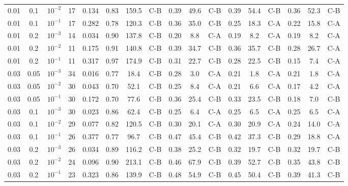\begin{tabular}{cccrrcccccccccccc}
0.01 & 0.1 & $10^{-2}$ & 17 & 0.134 & 0.83 & 159.5 & C-B & 0.39 & 49.6 & C-B & 0.39 & 54.4 & C-B & 0.36 & 52.3 & C-B \\
0.01 & 0.1 & $10^{-1}$ & 17 & 0.282 & 0.78 & 120.3 & C-B & 0.36 & 35.0 & C-B & 0.25 & 18.3 & C-A & 0.22 & 15.8 & C-A \\
0.01 & 0.2 & $10^{-3}$ & 14 & 0.034 & 0.90 & 137.8 & C-B & 0.20 & 8.8 & C-A & 0.19 & 8.2 & C-A & 0.19 & 8.2 & C-A \\
0.01 & 0.2 & $10^{-2}$ & 11 & 0.175 & 0.91 & 140.8 & C-B & 0.39 & 34.7 & C-B & 0.36 & 35.7 & C-B & 0.28 & 26.7 & C-A \\
0.01 & 0.2 & $10^{-1}$ & 11 & 0.317 & 0.97 & 174.9 & C-B & 0.31 & 22.7 & C-B & 0.28 & 22.5 & C-B & 0.15 & 7.4 & C-A \\
0.03 & 0.05 & $10^{-3}$ & 34 & 0.016 & 0.77 & 18.4 & C-B & 0.28 & 3.0 & C-A & 0.21 & 1.8 & C-A & 0.21 & 1.8 & C-A \\
0.03 & 0.05 & $10^{-2}$ & 30 & 0.043 & 0.70 & 52.1 & C-B & 0.25 & 8.4 & C-A & 0.21 & 6.6 & C-A & 0.17 & 4.2 & C-A \\
0.03 & 0.05 & $10^{-1}$ & 30 & 0.172 & 0.70 & 77.6 & C-B & 0.36 & 25.4 & C-B & 0.33 & 23.5 & C-B & 0.18 & 7.0 & C-B \\
0.03 & 0.1 & $10^{-3}$ & 30 & 0.023 & 0.86 & 62.4 & C-B & 0.25 & 6.4 & C-A & 0.25 & 6.5 & C-A & 0.25 & 6.5 & C-A \\
0.03 & 0.1 & $10^{-2}$ & 29 & 0.077 & 0.82 & 120.5 & C-B & 0.30 & 20.1 & C-A & 0.30 & 20.9 & C-A & 0.24 & 14.0 & C-A \\
0.03 & 0.1 & $10^{-1}$ & 26 & 0.377 & 0.77 & 96.7 & C-B & 0.47 & 45.4 & C-B & 0.42 & 37.3 & C-B & 0.29 & 18.8 & C-A \\
0.03 & 0.2 & $10^{-3}$ & 26 & 0.034 & 0.89 & 116.2 & C-B & 0.38 & 25.2 & C-B & 0.32 & 19.7 & C-B & 0.32 & 19.7 & C-B \\
0.03 & 0.2 & $10^{-2}$ & 24 & 0.096 & 0.90 & 213.1 & C-B & 0.46 & 67.9 & C-B & 0.39 & 52.7 & C-B & 0.35 & 43.8 & C-B \\
0.03 & 0.2 & $10^{-1}$ & 23 & 0.323 & 0.86 & 139.9 & C-B & 0.48 & 54.9 & C-B & 0.45 & 50.4 & C-B & 0.39 & 41.3 & C-B \\
\bottomrule
\end{tabular}

